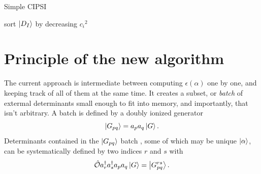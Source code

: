 \documentclass[./thesis.tex]{subfiles}
\begin{document}
\begin{algorithm}
        \label{alg:cipsi_manu}
        \caption{Simple CIPSI}
                \KwData{ $\ket \Psi$ }
                sort $\ket {D_I}$ by decreasing ${c_i}^2$ \;
\end{algorithm}


\section{Principle of the new algorithm}

The current approach is intermediate between computing $\epsilon(\alpha)$ one by one, and keeping track of all of them at the same time.
It creates a subset, or \emph{batch} of extermal determinants small enough to fit into memory, and importantly, that isn't arbitrary.
A batch is defined by a doubly ionized generator
\begin{equation}
\ket {G_{pq}} = a_p a_q \ket G.
\end{equation}
Determinants contained in the $\ket {G_{pq}}$ batch , some of which may be unique ${\ket{\alpha}}$, can be systematically defined by two indices $r$ and $s$ with
\begin{equation}
{\hat{\mathcal{O}}} a^\dagger_r a^\dagger_s a_p a_q  \ket G = \ket{G^{rs}_{pq}}.
\end{equation}
\end{document}
